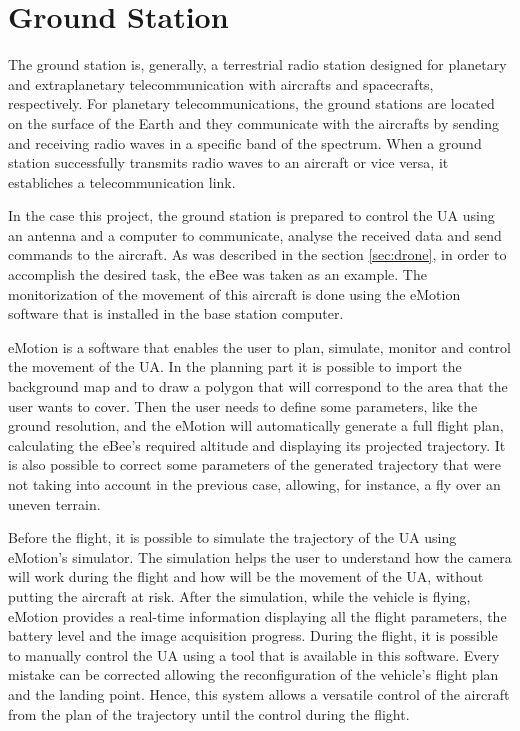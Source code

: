 \section{Ground Station}\label{sec:gs}

The ground station is, generally, a terrestrial radio station designed for planetary and extraplanetary telecommunication with aircrafts and spacecrafts, respectively. For planetary telecommunications, the ground stations are located on the surface of the Earth and they communicate with the aircrafts by sending and receiving radio waves in a specific band of the spectrum. When a ground station successfully transmits radio waves to an aircraft or vice versa, it establiches a telecommunication link.

In the case this project, the ground station is prepared to control the UA using an antenna and a computer to communicate, analyse the received data and send commands to the aircraft. As was described in the section \ref{sec:drone}, in order to accomplish the desired task, the eBee was taken as an example. The monitorization of the movement of this aircraft is done using the eMotion software that is installed in the base station computer.

eMotion is a software that enables the user to plan, simulate, monitor and control the movement of the UA. In the planning part it is possible to import the background map and to draw a polygon that will correspond to the area that the user wants to cover. Then the user needs to define some parameters, like the ground resolution, and the eMotion will automatically generate a full flight plan, calculating the eBee’s required altitude and displaying its projected trajectory. It is also possible to correct some parameters of the generated trajectory that were not taking into account in the previous case, allowing, for instance, a fly over an uneven terrain.

Before the flight, it is possible to simulate the trajectory of the UA using eMotion's simulator. The simulation helps the user to understand how the camera will work during the flight and how will be the movement of the UA, without putting the aircraft at risk. After the simulation, while the vehicle is flying, eMotion provides a real-time information displaying all the flight parameters, the battery level and the image acquisition progress. During the flight, it is possible to manually control the UA using a tool that is available in this software. Every mistake can be corrected allowing the reconfiguration of the vehicle's flight plan and the landing point. Hence, this system allows a versatile control of the aircraft from the plan of the trajectory until the control during the flight.